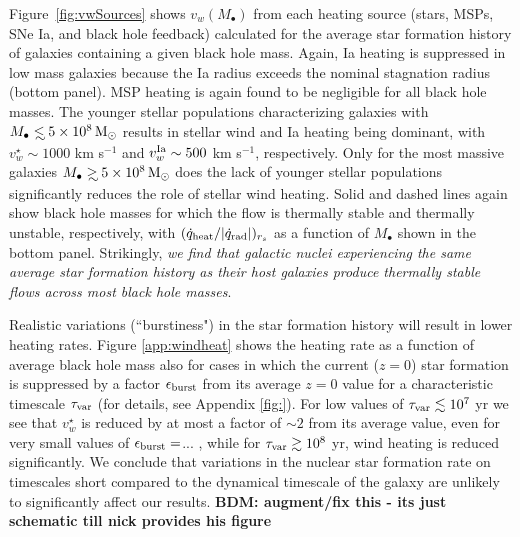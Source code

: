 \documentclass[usenatbib,fleqn]{mn2e}
\newcommand\lsim{\mathrel{\rlap{\lower4pt\hbox{\hskip1pt$\sim$}}
    \raise1pt\hbox{$<$}}}
\newcommand\gsim{\mathrel{\rlap{\lower4pt\hbox{\hskip1pt$\sim$}}
    \raise1pt\hbox{$>$}}}
\newcommand{\Mbh}[1][]{M_{\bullet#1}}
\newcommand{\vwO}{v_{w}}
\begin{document}
Figure~\ref{fig:vwSources} shows $\vwO(M_{\bullet})$ from each heating source (stars, MSPs, SNe Ia, and black hole feedback) calculated for the average star formation history of galaxies containing a given black hole mass.  Again, Ia heating is suppressed in low mass galaxies because the Ia radius exceeds the nominal stagnation radius (bottom panel).  MSP heating is again found to be negligible for all black hole masses.  The younger stellar populations characterizing galaxies with $\Mbh\lsim 5\times 10^{8} \Msun$ results in stellar wind and Ia heating being dominant, with $v_{w}^{\star} \sim 1000$ km s$^{-1}$ and $v_w^{\rm Ia} \sim 500$ km s$^{-1}$, respectively.  Only for the most massive galaxies $\Mbh\gsim 5\times 10^{8} \Msun$ does the lack of younger stellar populations significantly reduces the role of stellar wind heating.   Solid and dashed lines again show black hole masses for which the flow is thermally stable and thermally unstable, respectively, with $(\dot{q}_{\rm heat}/|\dot{q}_{\rm rad}|)_{r_{s}}$ as a function of $M_{\bullet}$ shown in the bottom panel.  Strikingly, {\it we find that galactic nuclei experiencing the same average star formation history as their host galaxies produce thermally stable flows across most black hole masses}.  

Realistic variations (``burstiness") in the star formation history will result in lower heating rates.  Figure \ref{app:windheat}  shows the heating rate as a function of average black hole mass also for cases in which the current ($z = 0$) star formation is suppressed by a factor $\epsilon_{\rm burst}$ from its average $z = 0$ value for a characteristic timescale $\tau_{\rm var}$ (for details, see Appendix \ref{fig:}).  For low values of $\tau_{\rm var} \lesssim 10^{7}$ yr we see that $v_{w}^{\star}$ is reduced by at most a factor of $\sim 2$ from its average value, even for very small values of $\epsilon_{\rm burst}=$... , while for $\tau_{\rm var} \gtrsim 10^{8}$ yr, wind heating is reduced significantly.  We conclude that variations in the nuclear star formation rate on timescales short compared to the dynamical timescale of the galaxy are unlikely to significantly affect our results.  {\bf BDM: augment/fix this - its just schematic till nick provides his figure}




\end{document}
